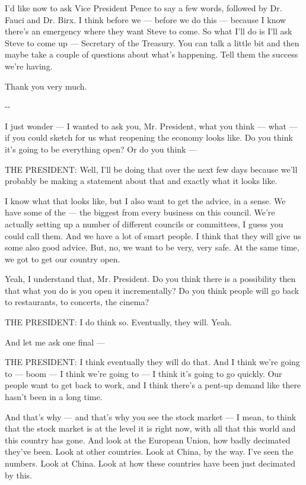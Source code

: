 I'd like now to ask Vice President Pence to say a few words, followed by
Dr. Fauci and Dr. Birx. I think before we --- before we do this ---
because I know there's an emergency where they want Steve to come. So
what I'll do is I'll ask Steve to come up --- Secretary of the Treasury.
You can talk a little bit and then maybe take a couple of questions
about what's happening. Tell them the success we're having.

Thank you very much.

-\/-

I just wonder --- I wanted to ask you, Mr. President, what you think ---
what --- if you could sketch for us what reopening the economy looks
like. Do you think it's going to be everything open? Or do you think ---

THE PRESIDENT: Well, I'll be doing that over the next few days because
we'll probably be making a statement about that and exactly what it
looks like.

I know what that looks like, but I also want to get the advice, in a
sense. We have some of the --- the biggest from every business on this
council. We're actually setting up a number of different councils or
committees, I guess you could call them. And we have a lot of smart
people. I think that they will give us some also good advice. But, no,
we want to be very, very safe. At the same time, we got to get our
country open.

Yeah, I understand that, Mr. President. Do you think there is a
possibility then that what you do is you open it incrementally? Do you
think people will go back to restaurants, to concerts, the cinema?

THE PRESIDENT: I do think so. Eventually, they will. Yeah.

And let me ask one final ---

THE PRESIDENT: I think eventually they will do that. And I think we're
going to --- boom --- I think we're going to --- I think it's going to
go quickly. Our people want to get back to work, and I think there's a
pent-up demand like there hasn't been in a long time.

And that's why --- and that's why you see the stock market --- I mean,
to think that the stock market is at the level it is right now, with all
that this world and this country has gone. And look at the European
Union, how badly decimated they've been. Look at other countries. Look
at China, by the way. I've seen the numbers. Look at China. Look at how
these countries have been just decimated by this.

